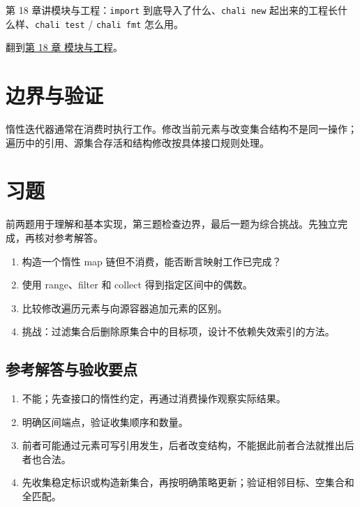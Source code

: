 第 18 章讲模块与工程：\texttt{import} 到底导入了什么、\texttt{chali new} 起出来的工程长什么样、\texttt{chali test} / \texttt{chali fmt} 怎么用。

翻到\hyperref[ch:18]{第 18 章 模块与工程}。

\section{边界与验证}

惰性迭代器通常在消费时执行工作。修改当前元素与改变集合结构不是同一操作；遍历中的引用、源集合存活和结构修改按具体接口规则处理。

\section{习题}

前两题用于理解和基本实现，第三题检查边界，最后一题为综合挑战。先独立完成，再核对参考解答。

\begin{enumerate}

\item 构造一个惰性 map 链但不消费，能否断言映射工作已完成？

\item 使用 range、filter 和 collect 得到指定区间中的偶数。

\item 比较修改遍历元素与向源容器追加元素的区别。

\item 挑战：过滤集合后删除原集合中的目标项，设计不依赖失效索引的方法。

\end{enumerate}

\subsection*{参考解答与验收要点}

\begin{enumerate}

\item 不能；先查接口的惰性约定，再通过消费操作观察实际结果。

\item 明确区间端点，验证收集顺序和数量。

\item 前者可能通过元素可写引用发生，后者改变结构，不能据此前者合法就推出后者也合法。

\item 先收集稳定标识或构造新集合，再按明确策略更新；验证相邻目标、空集合和全匹配。

\end{enumerate}

